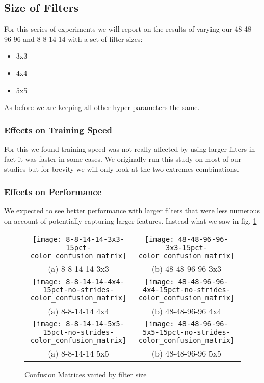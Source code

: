 \subsection{Size of Filters}
For this series of experiments we will report on the results of varying our 48-48-96-96 and 8-8-14-14 with a set of filter sizes:

\begin{itemize}
	\item 3x3
	\item 4x4
	\item 5x5
\end{itemize}

As before we are keeping all other hyper parameters the same.

\subsubsection{Effects on Training Speed}
For this we found training speed was not really affected by using larger filters in fact it was faster in some cases. We originally run this study on most of our studies but for brevity we will only look at the two extremes combinations.

\subsubsection{Effects on Performance}
We expected to see better performance with larger filters that were less numerous on account of potentially capturing larger features. Instead what we saw in fig. \ref{conffs}

\begin{figure}[h!]
	\begin{tabular}{cc}
		\texttt{[image: 8-8-14-14-3x3-15pct-color\_confusion\_matrix]} &   \texttt{[image: 48-48-96-96-3x3-15pct-color\_confusion\_matrix]} \\
		(a) 8-8-14-14 3x3& (b) 48-48-96-96 3x3\\[6pt]
		\texttt{[image: 8-8-14-14-4x4-15pct-no-strides-color\_confusion\_matrix]} &   \texttt{[image: 48-48-96-96-4x4-15pct-no-strides-color\_confusion\_matrix]} \\
		(a) 8-8-14-14 4x4& (b) 48-48-96-96 4x4\\[6pt]
		\texttt{[image: 8-8-14-14-5x5-15pct-no-strides-color\_confusion\_matrix]} &   \texttt{[image: 48-48-96-96-5x5-15pct-no-strides-color\_confusion\_matrix]} \\
		(a) 8-8-14-14 5x5& (b) 48-48-96-96 5x5\\[6pt]
	\end{tabular}
	\caption{Confusion Matrices varied by filter size}
	\label{conffs}
\end{figure}

